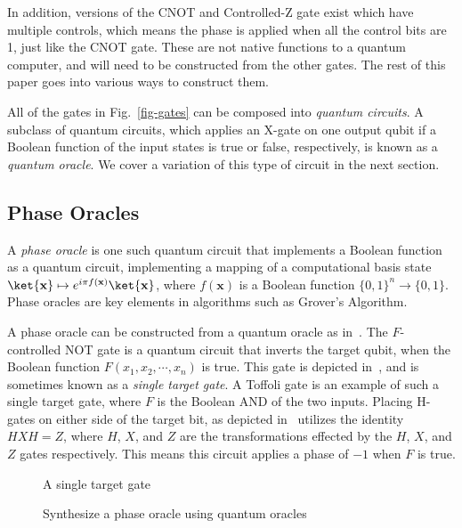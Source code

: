 In addition, versions of the CNOT and Controlled-Z gate exist which have multiple controls,
which means the phase is applied when all the control bits are 1, just like the CNOT gate.
These are not native functions to a quantum computer, and will need to be constructed from
the other gates. The rest of this paper goes into various ways to construct them.

All of the gates in Fig.~\ref{fig-gates} can be composed into {\it quantum circuits}.
A subclass of quantum circuits, which applies an X-gate on one output qubit
if a Boolean function of the input states is true or false, respectively, is known as a
{\it quantum oracle}. We cover a variation of this type of circuit in the next section.

\subsection{Phase Oracles}
\label{Pre:oracle}
A {\it phase oracle} is one such quantum circuit that implements a Boolean function as a
quantum circuit, implementing a mapping of a computational basis state
$\ket{\mathbf{x}} \mapsto e^{i \pi f(\mathbf{x})}\ket{\mathbf{x}}$, where $f(\mathbf{x})$
is a Boolean function $\{0,1\}^n \rightarrow \{0,1\}$. Phase oracles are key elements in
algorithms such as Grover's Algorithm.

A phase oracle can be constructed from a quantum oracle as in~. The
$F$-controlled NOT gate is a quantum circuit that inverts the target qubit, when the Boolean
function $F(x_1,x_2,\cdots,x_n)$ is true. This gate is depicted in~, and is
sometimes known as a {\it single target gate}. A Toffoli gate is an example of such a single
target gate, where $F$ is the Boolean AND of the two inputs. Placing H-gates on either side of
the target bit, as depicted in~ utilizes the identity $HXH = Z$, where
$H$, $X$, and $Z$ are the transformations effected by the $H$, $X$, and $Z$ gates respectively.
This means this circuit applies a phase of $-1$ when $F$ is true.

\begin{figure}[t]
  \centering
  \scalebox{1.0} {
    
  }
  \caption{A single target gate}
  \label{fig-urtof}
\end{figure}


\begin{figure}[t]
  \centering
  \scalebox{1.0} {
    
  }
  \caption{Synthesize a phase oracle using quantum oracles}
  \label{fig-phase-n4}
\end{figure}

